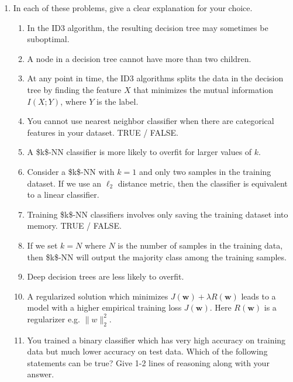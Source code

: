 \documentclass[letterpaper]{article}
\theoremstyle{definition}
\begin{document}
\begin{enumerate}
\item In each of these problems, give a clear explanation for your
choice.

\begin{enumerate}
\item In the ID3 algorithm, the resulting decision tree may sometimes
be suboptimal.

\item A node in a decision tree cannot have more than two children.

\item At any point in time, the ID3 algorithms splits the data in the
decision tree by finding the feature \(X\) that minimizes the
mutual information \(I(X ; Y)\), where \(Y\) is the label.

\item You cannot use nearest neighbor classifier when there are
categorical features in your dataset. TRUE / FALSE.

\item A \$k\$-NN classifier is more likely to overfit for larger values
of \(k\).

\item Consider a \$k\$-NN with \(k=1\) and only two samples in the
training dataset. If we use an \(\ell_{2}\) distance metric, then
the classifier is equivalent to a linear classifier.

\item Training \$k\$-NN classifiers involves only saving the training
dataset into memory. TRUE / FALSE.

\item If we set \(k=N\) where \(N\) is the number of samples in the
training data, then \$k\$-NN will output the majority class among
the training samples.

\item Deep decision trees are less likely to overfit.

\item A regularized solution which minimizes \(J(\mathbf{w})+\lambda
      R(\mathbf{w})\) leads to a model with a higher empirical training
loss \(J(\mathbf{w})\). Here \(R(\mathbf{w})\) is a regularizer e.g.
\(\|w\|_{2}^{2}\).

\item You trained a binary classifier which has very high accuracy on
training data but much lower accuracy on test data. Which of the
following statements can be true? Give 1-2 lines of reasoning
along with your answer.


\end{enumerate}
\end{enumerate}
\end{document}
